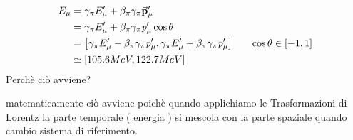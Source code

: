 \begin{align*}
        E_{\mu} &= \gamma_{\pi}E^{\prime}_{\mu} + \beta_{\pi}\gamma_{\pi}\va{p}^{\prime}_{\mu} \\
                &= \gamma_{\pi}E^{\prime}_{\mu} + \beta_{\pi}\gamma_{\pi}\textit{p}^{\prime}_{\mu}\cos{\theta}\\
                &= \qty[\gamma_{\pi}E^{\prime}_{\mu} - \beta_{\pi}\gamma_{\pi}\textit{p}^{\prime}_{\mu} , \gamma_{\pi}E^{\prime}_{\mu} + \beta_{\pi}\gamma_{\pi}\textit{p}^{\prime}_{\mu}]  \tag*{$\cos{\theta} \in [-1,1]$} \\
                &\simeq \qty[105.6 MeV , 122.7 MeV]
\end{align*}
Perchè ciò avviene? \\
\begin{tcolorbox}[colback=red!5!white,colframe=red!50!black,title=ATTENZIONE !]
matematicamente ciò avviene poichè quando applichiamo le Trasformazioni di Lorentz la parte temporale ( energia ) si mescola con la parte spaziale 
quando cambio sistema di riferimento.
\end{tcolorbox}
